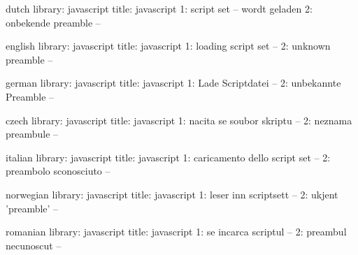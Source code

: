





\unprotect


\startmessages  dutch  library: javascript
  title: javascript
      1: script set -- wordt geladen
      2: onbekende preamble --
\stopmessages

\startmessages  english  library: javascript
  title: javascript
      1: loading script set --
      2: unknown preamble --
\stopmessages

\startmessages  german  library: javascript
  title: javascript
      1: Lade Scriptdatei --
      2: unbekannte Preamble --
\stopmessages

\startmessages  czech  library: javascript
  title: javascript
      1: nacita se soubor skriptu --
      2: neznama preambule --
\stopmessages

\startmessages  italian  library: javascript
  title: javascript
      1: caricamento dello script set --
      2: preambolo sconosciuto --
\stopmessages

\startmessages  norwegian library: javascript
  title: javascript
      1: leser inn scriptsett --
      2: ukjent 'preamble' --
\stopmessages

\startmessages  romanian  library: javascript
  title: javascript
      1: se incarca scriptul --
      2: preambul necunoscut --
\stopmessages

